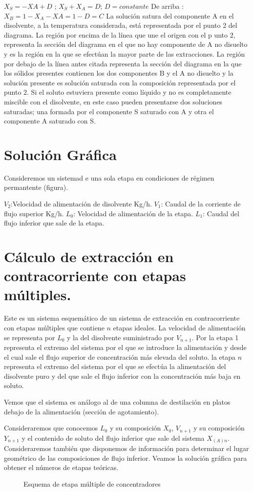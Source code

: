 \documentclass[12pt,openany]{book}
\begin{document}
$X_S=-XA+D$ ; $X_S+X_A=D$; $D=constante$
De arriba : $X_B=1-X_A-XA=1-D=C$
La solución satura del componente A en el disolvente, a la temperatura considerada, está representada por el punto 2 del diagrama.
La región por encima de la línea que une el origen con el p unto 2, representa la sección del diagrama en el que no hay componente de A no disuelto y es la región en la que se efectúan la mayor parte de las extracciones.
La región por debajo de la línea antes citada representa la sección del diagrama en la que los sólidos presentes contienen los dos componentes B y el A no disuelto y la solución presente es solución saturada con la composición representada por el punto 2.
Si el soluto estuviera presente como líquido y no es completamente miscible con el disolvente, en este caso pueden presentarse dos soluciones saturadas; una formada por el componente S saturado con A y otra el componente A saturado con S.
\section{Solución Gráfica}
Consideremos un sistemad e una sola etapa en condiciones de régimen permantente (figura).

$V_2$:Velocidad de alimentación de disolvente Kg/h.
$V_1$: Caudal de la corriente de flujo superior Kg/h.
$L_0$: Velocidad de alimentación de la etapa.
$L_1$: Caudal del flujo inferior que sale de la etapa.



\section {Cálculo de extracción en contracorriente con etapas múltiples.}


Este es un sistema esquemático de un sistema de extracción en contracorriente con etapas múltiples que contiene $n$ etapas ideales. La velocidad de alimentación se representa por $L_0$ y la del disolvente suministrado por $V_{n+1}$. Por la etapa 1 representa el extremo del sistema por el que se introduce la alimentación y desde el cual sale el flujo superior de concentración más elevada del soluto. la etapa $n$ representa el extremo del sistema por el que se efectúa la alimentación del disolvente puro y del que sale el flujo inferior con la concentración más baja en soluto.
  
Vemos que el sistema es análogo al de una columna de destilación en platos debajo de la alimentación (sección de agotamiento).

Consideraremos que conocemos $L_0$ y su composición $X_0$, $V_{n+1}$ y su composición $Y_{n+1}$ y el contenido de soluto del flujo inferior que sale del sistema  $X_{(A)n}$. Consideraremos también que disponemos de información para determinar el lugar geométrico de las composiciones de flujo inferior. Veamos la solución gráfica para obtener el números de etapas teóricas.
\begin{figure}
    \center
    \tiny  
    
    \caption{Esquema de etapa múltiple de concentradores}
\end{figure}
    
\end{document}
